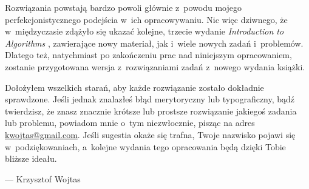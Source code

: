 Rozwiązania powstają bardzo powoli głównie z~powodu mojego perfekcjonistycznego podejścia w~ich opracowywaniu.
Nic więc dziwnego, że w~międzyczasie zdążyło się ukazać kolejne, trzecie wydanie \textsl{Introduction to Algorithms} \cite{cormen3}, zawierające nowy materiał, jak i~wiele nowych zadań i~problemów.
Dlatego też, natychmiast po zakończeniu prac nad niniejszym opracowaniem, zostanie przygotowana wersja z~rozwiązaniami zadań z~nowego wydania książki.

Dołożyłem wszelkich starań, aby każde rozwiązanie zostało dokładnie sprawdzone.
Jeśli jednak znalazłeś błąd merytoryczny lub typograficzny, bądź twierdzisz, że znasz znacznie krótsze lub prostsze rozwiązanie jakiegoś zadania lub problemu, powiadom mnie o~tym niezwłocznie, pisząc na adres \url{kwojtas@gmail.com}.
Jeśli sugestia okaże się trafna, Twoje nazwisko pojawi się w~podziękowaniach, a~kolejne wydania tego opracowania będą dzięki Tobie bliższe ideału.

\bigskip
\bigskip
{}\hfill--- Krzysztof Wojtas

\endinput

